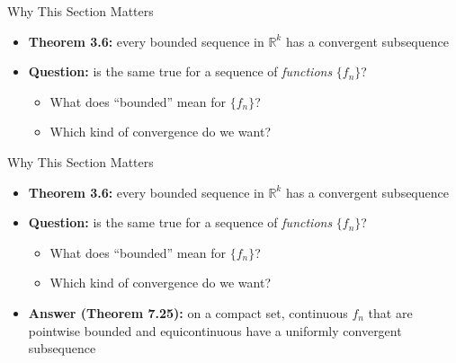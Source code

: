 \documentclass[aspectratio=169,12pt,t]{beamer}
\begin{document}
{%
\begin{frame}{Why This Section Matters}
  \begin{hlbox}
  \begin{itemize}
    \item \textbf{Theorem 3.6:} every \alert{bounded} sequence in $\mathbb{R}^k$
      has a \alert{convergent subsequence}
    \item \textbf{Question:} is the same true for a sequence of
      \emph{functions} $\{f_n\}$?
      \begin{itemize}
        \item What does ``bounded'' mean for $\{f_n\}$?
        \item Which kind of convergence do we want?
      \end{itemize}
  \end{itemize}
  \end{hlbox}

\end{frame}

\begin{frame}{Why This Section Matters}
  \begin{hlbox}
  \begin{itemize}
    \item \textbf{Theorem 3.6:} every \alert{bounded} sequence in $\mathbb{R}^k$
      has a \alert{convergent subsequence}
    \item \textbf{Question:} is the same true for a sequence of
      \emph{functions} $\{f_n\}$?
      \begin{itemize}
        \item What does ``bounded'' mean for $\{f_n\}$?
        \item Which kind of convergence do we want?
      \end{itemize}
    \item \textbf{Answer (Theorem 7.25):} on a compact set, continuous $f_n$ that are
      pointwise bounded and \alert{equicontinuous} have a \alert{uniformly}
      convergent subsequence
  \end{itemize}
  \end{hlbox}


\end{frame}}
\end{document}
